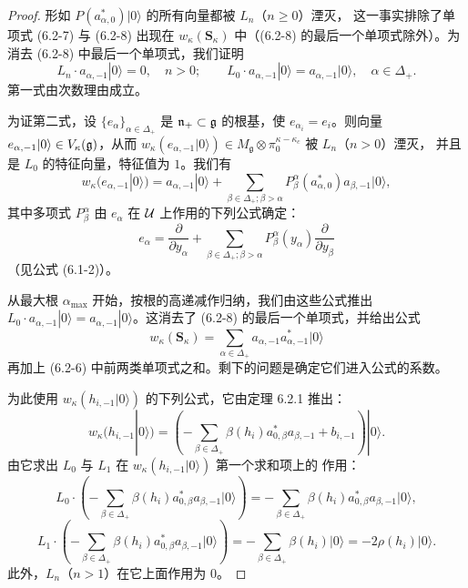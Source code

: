 \begin{proof}
    形如 $P(a^*_{\alpha,0})|0\rangle$ 的所有向量都被 $L_n$（$n\ge0$）湮灭，
    这一事实排除了单项式 (6.2-7) 与 (6.2-8) 出现在
    $w_\kappa(\mathbf S_\kappa)$ 中（(6.2-8) 的最后一个单项式除外）。为消去
    (6.2-8) 中最后一个单项式，我们证明
    \[
        L_n\cdot a_{\alpha,-1}|0\rangle=0,\quad n>0;
        \qquad
        L_0\cdot a_{\alpha,-1}|0\rangle=a_{\alpha,-1}|0\rangle,
        \quad\alpha\in\Delta_+.
    \]
    第一式由次数理由成立。

    为证第二式，设 $\{e_\alpha\}_{\alpha\in\Delta_+}$ 是
    $\mathfrak n_+\subset\mathfrak{g}$ 的根基，使 $e_{\alpha_i}=e_i$。则向量
    $e_{\alpha,-1}|0\rangle\in V_\kappa(\mathfrak{g})$，从而
    $w_\kappa(e_{\alpha,-1}|0\rangle)\in
    M_{\mathfrak g}\otimes\pi_0^{\kappa-\kappa_c}$ 被 $L_n$（$n>0$）湮灭，
    并且是 $L_0$ 的特征向量，特征值为 $1$。我们有
    \begin{equation}
        w_\kappa(e_{\alpha,-1}|0\rangle)=a_{\alpha,-1}|0\rangle
        +\sum_{\beta\in\Delta_+;\beta>\alpha}
        P^\alpha_\beta(a^*_{\alpha,0})a_{\beta,-1}|0\rangle,
        \tag{6.2-9}
    \end{equation}
    其中多项式 $P^\alpha_\beta$ 由 $e_\alpha$ 在 $\mathcal{U}$ 上作用的下列公式确定：
    \[
        e_\alpha=\frac{\partial}{\partial y_\alpha}
        +\sum_{\beta\in\Delta_+;\beta>\alpha}
        P^\alpha_\beta(y_\alpha)\frac{\partial}{\partial y_\beta}
    \]
    （见公式 (6.1-2)）。

    从最大根 $\alpha_{\max}$ 开始，按根的高递减作归纳，我们由这些公式推出
    $L_0\cdot a_{\alpha,-1}|0\rangle=a_{\alpha,-1}|0\rangle$。这消去了
    (6.2-8) 的最后一个单项式，并给出公式
    \begin{equation}
        w_\kappa(\mathbf S_\kappa)
        =\sum_{\alpha\in\Delta_+}a_{\alpha,-1}a^*_{\alpha,-1}|0\rangle
        \tag{6.2-10}
    \end{equation}
    再加上 (6.2-6) 中前两类单项式之和。剩下的问题是确定它们进入公式的系数。

    为此使用 $w_\kappa(h_{i,-1}|0\rangle)$ 的下列公式，它由定理 6.2.1 推出：
    \begin{equation}
        w_\kappa(h_{i,-1}|0\rangle)
        =\left(-\sum_{\beta\in\Delta_+}
        \beta(h_i)a^*_{0,\beta}a_{\beta,-1}+b_{i,-1}\right)|0\rangle.
        \tag{6.2-11}
    \end{equation}
    由它求出 $L_0$ 与 $L_1$ 在 $w_\kappa(h_{i,-1}|0\rangle)$ 第一个求和项上的
    作用：
    \[
        L_0\cdot\left(-\sum_{\beta\in\Delta_+}
        \beta(h_i)a^*_{0,\beta}a_{\beta,-1}|0\rangle\right)
        =-\sum_{\beta\in\Delta_+}
        \beta(h_i)a^*_{0,\beta}a_{\beta,-1}|0\rangle,
    \]
    \[
        L_1\cdot\left(-\sum_{\beta\in\Delta_+}
        \beta(h_i)a^*_{0,\beta}a_{\beta,-1}|0\rangle\right)
        =-\sum_{\beta\in\Delta_+}\beta(h_i)|0\rangle
        =-2\rho(h_i)|0\rangle.
    \]
    此外，$L_n$（$n>1$）在它上面作用为 $0$。


\end{proof}
